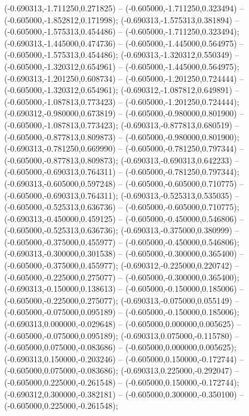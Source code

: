  (-0.690313,-1.711250,0.271825) -- (-0.605000,-1.711250,0.323494) -- (-0.605000,-1.852812,0.171998);
 (-0.690313,-1.575313,0.381894) -- (-0.605000,-1.575313,0.454486) -- (-0.605000,-1.711250,0.323494);
 (-0.690313,-1.445000,0.474736) -- (-0.605000,-1.445000,0.564975) -- (-0.605000,-1.575313,0.454486);
 (-0.690313,-1.320312,0.550349) -- (-0.605000,-1.320312,0.654961) -- (-0.605000,-1.445000,0.564975);
 (-0.690313,-1.201250,0.608734) -- (-0.605000,-1.201250,0.724444) -- (-0.605000,-1.320312,0.654961);
 (-0.690312,-1.087812,0.649891) -- (-0.605000,-1.087813,0.773423) -- (-0.605000,-1.201250,0.724444);
 (-0.690312,-0.980000,0.673819) -- (-0.605000,-0.980000,0.801900) -- (-0.605000,-1.087813,0.773423);
 (-0.690313,-0.877813,0.680519) -- (-0.605000,-0.877813,0.809873) -- (-0.605000,-0.980000,0.801900);
 (-0.690313,-0.781250,0.669990) -- (-0.605000,-0.781250,0.797344) -- (-0.605000,-0.877813,0.809873);
 (-0.690313,-0.690313,0.642233) -- (-0.605000,-0.690313,0.764311) -- (-0.605000,-0.781250,0.797344);
 (-0.690313,-0.605000,0.597248) -- (-0.605000,-0.605000,0.710775) -- (-0.605000,-0.690313,0.764311);
 (-0.690313,-0.525313,0.535035) -- (-0.605000,-0.525313,0.636736) -- (-0.605000,-0.605000,0.710775);
 (-0.690313,-0.450000,0.459125) -- (-0.605000,-0.450000,0.546806) -- (-0.605000,-0.525313,0.636736);
 (-0.690313,-0.375000,0.380999) -- (-0.605000,-0.375000,0.455977) -- (-0.605000,-0.450000,0.546806);
 (-0.690313,-0.300000,0.301538) -- (-0.605000,-0.300000,0.365400) -- (-0.605000,-0.375000,0.455977);
 (-0.690312,-0.225000,0.220742) -- (-0.605000,-0.225000,0.275077) -- (-0.605000,-0.300000,0.365400);
 (-0.690313,-0.150000,0.138613) -- (-0.605000,-0.150000,0.185006) -- (-0.605000,-0.225000,0.275077);
 (-0.690313,-0.075000,0.055149) -- (-0.605000,-0.075000,0.095189) -- (-0.605000,-0.150000,0.185006);
 (-0.690313,0.000000,-0.029648) -- (-0.605000,0.000000,0.005625) -- (-0.605000,-0.075000,0.095189);
 (-0.690313,0.075000,-0.115780) -- (-0.605000,0.075000,-0.083686) -- (-0.605000,0.000000,0.005625);
 (-0.690313,0.150000,-0.203246) -- (-0.605000,0.150000,-0.172744) -- (-0.605000,0.075000,-0.083686);
 (-0.690313,0.225000,-0.292047) -- (-0.605000,0.225000,-0.261548) -- (-0.605000,0.150000,-0.172744);
 (-0.690312,0.300000,-0.382181) -- (-0.605000,0.300000,-0.350100) -- (-0.605000,0.225000,-0.261548);
